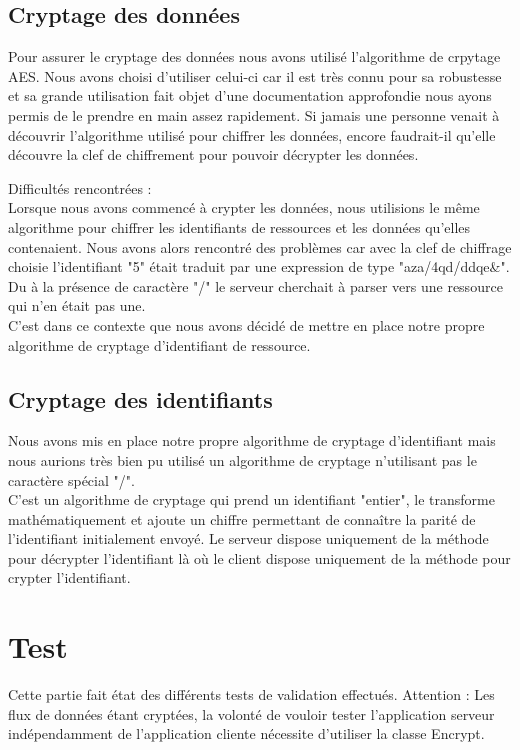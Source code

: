 \subsection{Cryptage des données}
Pour assurer le cryptage des données nous avons utilisé l'algorithme de crpytage AES. Nous avons choisi d'utiliser celui-ci car il est très connu pour sa robustesse et sa grande utilisation fait objet d'une documentation approfondie  nous ayons permis de le prendre en main assez rapidement.
Si jamais une personne venait à découvrir l'algorithme utilisé pour chiffrer les données, encore faudrait-il qu'elle découvre la clef de chiffrement pour pouvoir décrypter les données.

Difficultés rencontrées : \\
Lorsque nous avons commencé à crypter les données, nous utilisions le même algorithme pour chiffrer les identifiants de ressources et les données qu'elles contenaient.
Nous avons alors rencontré des problèmes car avec la clef de chiffrage choisie l'identifiant "5" était traduit par une expression de type "aza/4qd/ddqe&".
Du à la présence de caractère "/" le serveur cherchait à parser vers une ressource qui n'en était pas une.\\
C'est dans ce contexte que nous avons décidé de mettre en place notre propre algorithme de cryptage d'identifiant de ressource.

\subsection{Cryptage des identifiants}

Nous avons mis en place notre propre algorithme de cryptage d'identifiant mais nous aurions très bien pu utilisé un algorithme de cryptage n'utilisant pas le caractère spécial "/".\\
C'est un algorithme de cryptage qui prend un identifiant "entier", le transforme mathématiquement et ajoute un chiffre permettant de connaître la parité de l'identifiant initialement envoyé.
Le serveur dispose uniquement de la méthode pour décrypter l'identifiant là où le client dispose uniquement de la méthode pour crypter l'identifiant.

\newpage
\section{Test}

Cette partie fait état des différents tests de validation effectués.
Attention : Les flux de données étant cryptées, la volonté de vouloir tester l'application serveur indépendamment de l'application cliente nécessite d'utiliser la classe Encrypt.

